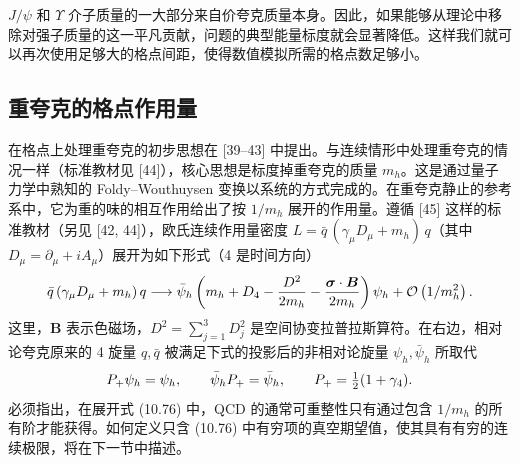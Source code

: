 $J/\psi$ 和 $\Upsilon$ 介子质量的一大部分来自价夸克质量本身。因此，如果能够从理论中移除对强子质量的这一平凡贡献，问题的典型能量标度就会显著降低。这样我们就可以再次使用足够大的格点间距，使得数值模拟所需的格点数足够小。

\subsection{重夸克的格点作用量}

在格点上处理重夸克的初步思想在 [39--43] 中提出。与连续情形中处理重夸克的情况一样（标准教材见 [44]），核心思想是标度掉重夸克的质量 $m_h$。这是通过量子力学中熟知的 Foldy--Wouthuysen 变换以系统的方式完成的。在重夸克静止的参考系中，它为重的味的相互作用给出了按 $1/m_h$ 展开的作用量。遵循 [45] 这样的标准教材（另见 [42, 44]），欧氏连续作用量密度 $L = \bar q\,(\gamma_\mu D_\mu + m_h)\,q$（其中 $D_\mu = \partial_\mu + iA_\mu$）展开为如下形式（4 是时间方向）
\begin{equation}
  \bar q\,(\gamma_\mu D_\mu + m_h)\,q
  \longrightarrow \bar\psi_h\left(m_h + D_4
  - \frac{D^2}{2m_h} - \frac{\boldsymbol{\sigma}\cdot\boldsymbol{B}}{2m_h}
  \right)\psi_h + \mathcal{O}\left(1/m_h^2\right) .
\end{equation}
这里，$\boldsymbol{B}$ 表示色磁场，$D^2 = \sum_{j=1}^{3}D_j^2$ 是空间协变拉普拉斯算符。在右边，相对论夸克原来的 4 旋量 $q, \bar q$ 被满足下式的投影后的非相对论旋量 $\psi_h, \bar\psi_h$ 所取代
\begin{equation}
  P_+\psi_h = \psi_h , \qquad \bar\psi_h P_+ = \bar\psi_h , \qquad
  P_+ = \tfrac{1}{2}(1 + \gamma_4) .
\end{equation}
必须指出，在展开式 (10.76) 中，QCD 的通常可重整性只有通过包含 $1/m_h$ 的所有阶才能获得。如何定义只含 (10.76) 中有穷项的真空期望值，使其具有有穷的连续极限，将在下一节中描述。

